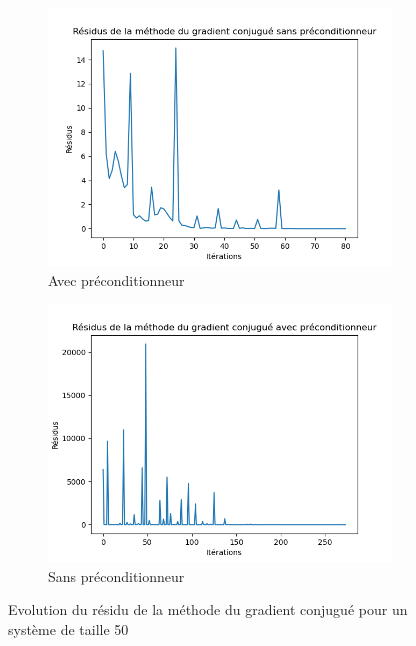 \documentclass{article}
\begin{document}
\begin{figure}[ht]
  \centering
  \begin{subfigure}{0.35\textwidth}
    \centering
    \includegraphics[width=\linewidth]{Figure_4.png}
    \caption{Avec préconditionneur}
    \label{subfig:50x50_grad_sans}
  \end{subfigure}
  \hfill
  \begin{subfigure}{0.35\textwidth}
    \centering
    \includegraphics[width=\linewidth]{Figure_8.png}
    \caption{Sans préconditionneur}
    \label{subfig:50x50_grad_prcd}
  \end{subfigure}
  \caption{Evolution du résidu de la méthode du gradient conjugué pour un système de taille 50}
  \label{fig:50x50_grad}
\end{figure}
\end{document}

